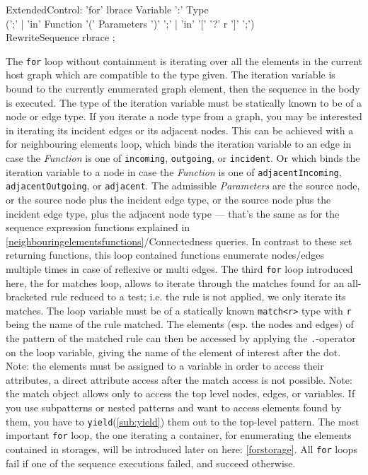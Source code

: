 \begin{rail}
  ExtendedControl:
    'for' lbrace Variable ':' Type\\
    (';' |
    'in' Function '(' Parameters ')' ';' |
    'in' '[' '?' r ']' ';')\\
    RewriteSequence rbrace
    ;
\end{rail}\label{forgraphelem}\label{forincidentadjacent}\label{formatch}

The \texttt{for} loop without containment is iterating over all the elements in the current host graph which are compatible to the type given.
The iteration variable is bound to the currently enumerated graph element, then the sequence in the body is executed.
The type of the iteration variable must be statically known to be of a node or edge type.
If you iterate a node type from a graph, you may be interested in iterating its incident edges or its adjacent nodes.
This can be achieved with a for neighbouring elements loop, which binds the iteration variable to an edge in case the \emph{Function} is one of \texttt{incoming}, \texttt{outgoing}, or \texttt{incident}. 
Or which binds the iteration variable to a node in case the \emph{Function} is one of \texttt{adjacentIncoming}, \texttt{adjacentOutgoing}, or \texttt{adjacent}.
The admissible \emph{Parameters} are the source node, or the source node plus the incident edge type, or the source node plus the incident edge type, plus the adjacent node type ---
that's the same as for the sequence expression functions explained in \ref{neighbouringelementsfunctions}/Connectedness queries.
In contrast to these set returning functions, this loop contained functions enumerate nodes/edges multiple times in case of reflexive or multi edges.
The third \texttt{for} loop introduced here, the for matches loop, allows to iterate through the matches found for an all-bracketed rule reduced to a test; i.e. the rule is not applied, we only iterate its matches.
The loop variable must be of a statically known \texttt{match<r>} type with \texttt{r} being the name of the rule matched.
The elements (esp. the nodes and edges) of the pattern of the matched rule can then be accessed by applying the \texttt{.}-operator on the loop variable, giving the name of the element of interest after the dot.
Note: the elements must be assigned to a variable in order to access their attributes, a direct attribute access after the match access is not possible.
Note: the match object allows only to access the top level nodes, edges, or variables.
If you use subpatterns or nested patterns and want to access elements found by them, you have to \texttt{yield}(\ref{sub:yield}) them out to the top-level pattern.
The most important \texttt{for} loop, the one iterating a container, for enumerating the elements contained in storages, will be introduced later on here: \ref{forstorage}.
All \texttt{for} loops fail if one of the sequence executions failed, and succeed otherwise.

